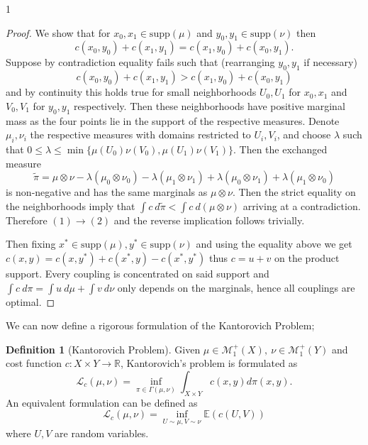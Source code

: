 \documentclass[12pt]{article}
\theoremstyle{definition}
\newtheorem{definition}[theorem]{Definition}
\theoremstyle{plain}
\begin{document}
\begin{spacing}{1}
{\begin{proof}
    We show that for $x_0, x_1 \in \text{supp}(\mu)$ and $y_0, y_1 \in \text{supp}(\nu)$ then \[
    c(x_0, y_0) + c(x_1, y_1) = c(x_1, y_0) + c(x_0, y_1).
    \]
    Suppose by contradiction equality fails such that (rearranging $y_0, y_1$ if necessary)
    \[
    c(x_0, y_0) + c(x_1, y_1) > c(x_1, y_0) + c(x_0, y_1)
    \]
    and by continuity this holds true for small neighborhoods $U_0, U_1$ for $x_0, x_1$ and $V_0, V_1$ for $y_0, y_1$ respectively. Then these neighborhoods have positive marginal mass as the four points lie in the support of the respective measures. Denote $\mu_i, \nu_i$ the respective measures with domains restricted to $U_i, V_i$, and choose $\lambda$ such that $0 \leq \lambda \leq \min\{\mu(U_0)\nu(V_0), \mu(U_1)\nu(V_1)\}$. Then the exchanged measure 
    \[
    \tilde{\pi} = \mu \otimes \nu - \lambda (\mu_0 \otimes \nu_0) - \lambda (\mu_1 \otimes \nu_1) + \lambda(\mu_0 \otimes \nu_1) + \lambda(\mu_1 \otimes \nu_0)
    \]
    is non-negative and has the same marginals as $\mu \otimes \nu$. Then the strict equality on the neighborhoods imply that $\displaystyle \int c \ d\tilde{\pi} < \int c\ d(\mu \otimes \nu)$ arriving at a contradiction. Therefore $(1) \rightarrow (2)$ and the reverse implication follows trivially.
    \bigskip
    
    Then fixing $x^* \in \text{supp}(\mu), y^* \in \text{supp}(\nu)$ and using the equality above we get $c(x, y) = c(x, y^*) + c(x^*, y) - c(x^*, y^*)$ thus $c = u + v$ on the product support. Every coupling is concentrated on said support and $\displaystyle \int c \ d\pi = \int u \ d\mu + \int v \ d\nu$ only depends on the marginals, hence all couplings are optimal.

    
\end{proof}

We can now define a rigorous formulation of the Kantorovich Problem;
\begin{definition}[Kantorovich Problem]
        Given $\mu \in \mathcal{M}_1^+(X), \ \nu \in \mathcal{M}_1^+(Y)$ and cost function $c: X \times Y \rightarrow \mathbb{R}$, Kantorovich's problem is formulated as
        \[
        \mathcal{L}_c(\mu, \nu) = \inf_{\pi \in \Gamma(\mu, \nu)} \displaystyle \int_{X \times Y}c(x, y)d\pi(x, y).
        \]
        An equivalent formulation can be defined as
        \[
        \mathcal{L}_c(\mu, \nu) = \inf_{U \sim \mu, V \sim \nu}\mathbb{E}(c(U, V))
        \]
        where $U, V$ are random variables.
    \end{definition}

}
\end{spacing}
\end{document}
